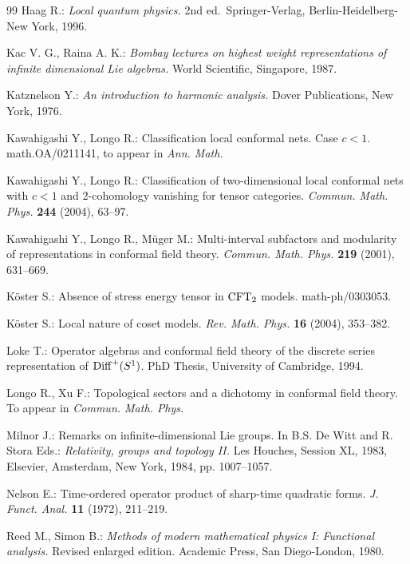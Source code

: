 \documentclass[12pt]{article}
\begin{document}
\begin{thebibliography}{99}
 Haag R.: {\it Local quantum physics.} 2nd ed.\,  
Springer-Verlag,  Berlin-Heidelberg-New York, 1996.

 Kac V. G., Raina A. K.: {\it Bombay lectures on highest 
weight representations of infinite dimensional Lie algebras.} World
Scientific, Singapore, 1987.

 Katznelson Y.: {\it An introduction to harmonic 
analysis.} Dover Publications, New York, 1976.

 Kawahigashi Y., Longo R.: Classification local conformal 
nets. Case $c<1$. math.OA/0211141, to appear in {\it Ann. Math.}

 Kawahigashi Y., Longo R.: Classification of two-dimensional 
local conformal nets with $c<1$ and 2-cohomology vanishing for tensor 
categories. {\it Commun. Math. Phys.} {\bf 244} (2004), 63--97.

 Kawahigashi Y., Longo R., M\"{u}ger M.: Multi-interval 
subfactors and modularity of representations in conformal field theory.
{\it Commun. Math. Phys.} {\bf 219} (2001), 631--669.

 K\"oster S.: Absence of stress energy tensor in
${\rm CFT}_2$ models. math-ph/0303053.
                                                                                
 K\"oster S.: Local nature of coset models.
{\it Rev. Math. Phys.} {\bf 16} (2004), 353--382. 

 Loke T.: Operator algebras and conformal field theory
of the discrete series representation of ${{\rm Diff}^+(S^1)}$. PhD Thesis, University 
of Cambridge, 1994. 
                                                                                
 Longo R., Xu F.: Topological sectors and a dichotomy in
conformal field theory. To appear in {\it Commun. Math. Phys.} 
                                                                                
 Milnor J.: Remarks on infinite-dimensional Lie groups. 
In B.S. De Witt and R. Stora Eds.: {\it Relativity, groups and topology 
II.} Les Houches, Session  XL, 1983, Elsevier, Amsterdam, New York, 1984, 
pp. 1007--1057.

 Nelson E.: Time-ordered operator product of sharp-time 
quadratic forms. {\it J. Funct. Anal.} {\bf 11} (1972), 211--219.

 Reed M., Simon B.: {\it Methods of modern mathematical 
physics I: Functional analysis.} Revised enlarged edition. Academic Press, 
San Diego-London, 1980.


\end{thebibliography}
\end{document}
